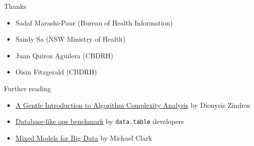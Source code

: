 \documentclass[aspectratio=169,12pt,usepdftitle=false]{beamer} %
\begin{document}




\begin{frame}{Thanks}
    \begin{itemize}
        \item Sadaf Marashi-Pour (Bureau of Health Information)
	\item Sandy Sa (NSW Ministry of Health)
	\item Juan Quiroz Aguilera (CBDRH)
	\item Oisin Fitzgerald (CBDRH)
    \end{itemize}
\end{frame}

\begin{frame}{Further reading}
    \begin{itemize}
	\item \href{https://discrete.gr/complexity/}{A Gentle Introduction to Algorithm Complexity Analysis} by Dionysis Zindros
	\item \href{https://h2oai.github.io/db-benchmark/}{Database-like ops benchmark} by \texttt{data.table} developers
	\item \href{https://m-clark.github.io/posts/2019-10-20-big-mixed-models/}{Mixed Models for Big Data} by Michael Clark
    \end{itemize}
\end{frame}

{
\begin{frame}[plain]
\end{frame}
}
\end{document}

